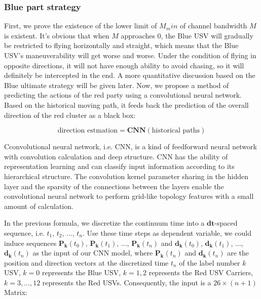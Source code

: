 \documentclass{mcmthesis}
\begin{document}
\subsubsection{Blue part strategy}

First, we prove the existence of the lower limit of $M_min$ of channel bandwidth $M$ is existent. It's obvious that when $M$ approaches $0$, the Blue USV will gradually be restricted to flying horizontally and straight, which means that the Blue USV's maneuverability will get worse and worse. Under the condition of flying in opposite directions, it will not have enough ability to avoid chasing, so it will definitely be intercepted in the end. A more quantitative discussion based on the Blue ultimate strategy will be given later. Now, we propose a method of predicting the actions of the red party using a convolutional neural network. Based on the historical moving path, it feeds back the prediction of the overall direction of the red cluster as a black box: \par

\begin{equation}
\mbox{direction estmation} = \mathbf{CNN}({\mbox{historical paths}})
\end{equation}

Cconvolutional neural network, i.e. CNN, is a kind of feedforward neural network with convolution calculation and deep structure. CNN has the ability of representation learning and can classify input information according to its hierarchical structure. The convolution kernel parameter sharing in the hidden layer and the sparsity of the connections between the layers enable the convolutional neural network to perform grid-like topology features with a small amount of calculation. \par

In the previous formula, we discretize the continuum time into a $\mathbf{dt}$-spaced sequence, i.e. $t_1$, $t_2$, ..., $t_n$.  Use these time steps as dependent variable, we could induce sequences $\mathbf{P_{k}}(t_0)$, $\mathbf{P_{k}}(t_1)$, ..., $\mathbf{P_{k}}(t_n)$ and $\mathbf{d_{k}}(t_0)$, $\mathbf{d_{k}}(t_1)$, ..., $\mathbf{d_{k}}(t_n)$  as the input of our CNN model, where $\mathbf{P_{k}}(t_n)$ and $\mathbf{d_{k}}(t_n)$ are the position and direction vectors at the discretized time $t_n$ of the label number $k$ USV, $k=0$ represents the Blue USV, $k = 1, 2$ represents the Red USV Carriers, $k=3,...,12$ represents the Red USVs. Consequently, the input is a $26 \times (n+1)$ Matrix:
\end{document}
